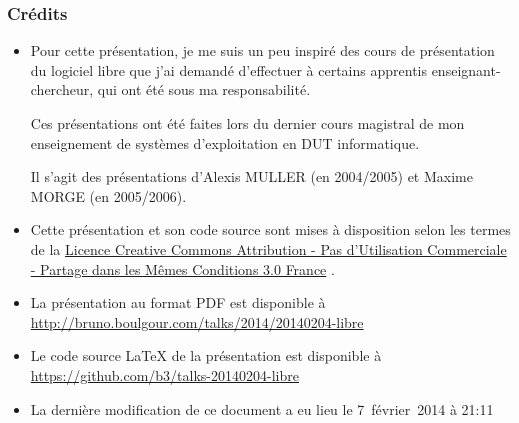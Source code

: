 \documentclass[10pt]{beamer}
\begin{document}
\begin{frame}
  \frametitle{Crédits}

  \small

  \begin{itemize}
  \item Pour cette présentation, je me suis un peu inspiré des cours de
    présentation du logiciel libre que j'ai demandé d'effectuer à certains
    apprentis enseignant-chercheur, qui ont été sous ma responsabilité.

    Ces présentations ont été faites lors du dernier cours magistral de mon
    enseignement de systèmes d'exploitation en DUT informatique.

    Il s'agit des présentations d'Alexis MULLER (en 2004/2005) et Maxime
    MORGE (en 2005/2006).
  
    \vfill
    
  \item Cette présentation et son code source sont mises à disposition
    selon les termes de la
    \href{https://creativecommons.org/licenses/by-nc-sa/3.0/fr/legalcode}{Licence
      Creative Commons Attribution - Pas d’Utilisation Commerciale - Partage
      dans les Mêmes Conditions 3.0 France} \ccbyncsa.

    \vfill

  \item La présentation au format PDF est disponible à \url{http://bruno.boulgour.com/talks/2014/20140204-libre}

    \vfill

  \item Le code source LaTeX de la présentation est disponible à \url{https://github.com/b3/talks-20140204-libre}

  \item La dernière modification de ce document a eu lieu le 7~février~2014 à 21:11 %
  \end{itemize}
\end{frame}
\end{document}
